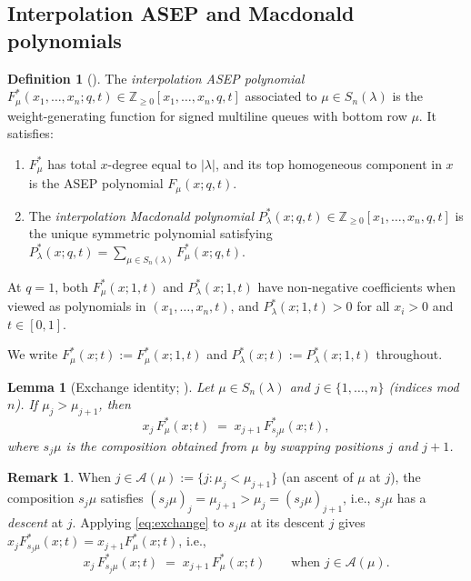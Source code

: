 \documentclass[12pt]{article}
\newtheorem{lemma}[theorem]{Lemma}
\theoremstyle{definition}
\newtheorem{definition}[theorem]{Definition}
\newtheorem{remark}[theorem]{Remark}
\begin{document}
\subsection{Interpolation ASEP and Macdonald polynomials}

\begin{definition}[{\cite[Def.~1.1,~Thm.~1.15]{BDW25}}]
\label{def:interpolation}
The \emph{interpolation ASEP polynomial}
$F^*_\mu(x_1,\dots,x_n;q,t) \in \mathbb{Z}_{\geq 0}[x_1,\dots,x_n,q,t]$
associated to $\mu \in S_n(\lambda)$ is the weight-generating function
for signed multiline queues with bottom row $\mu$.  It satisfies:
\begin{enumerate}[label=(\alph*)]
  \item $F^*_\mu$ has total $x$-degree equal to $|\lambda|$, and its top
        homogeneous component in $x$ is the ASEP polynomial $F_\mu(x;q,t)$.
  \item The \emph{interpolation Macdonald polynomial}
        $P^*_\lambda(x;q,t) \in \mathbb{Z}_{\geq 0}[x_1,\dots,x_n,q,t]$ is
        the unique symmetric polynomial satisfying $P^*_\lambda(x;q,t)
        = \sum_{\mu \in S_n(\lambda)} F^*_\mu(x;q,t)$.
\end{enumerate}
At $q = 1$, both $F^*_\mu(x;1,t)$ and $P^*_\lambda(x;1,t)$ have
non-negative coefficients when viewed as polynomials in $(x_1,\dots,x_n,t)$,
and $P^*_\lambda(x;1,t) > 0$ for all $x_i > 0$ and $t \in [0,1]$.
\end{definition}

We write $F^*_\mu(x;t) := F^*_\mu(x;1,t)$ and
$P^*_\lambda(x;t) := P^*_\lambda(x;1,t)$ throughout.

\begin{lemma}[Exchange identity; {\cite[Cor.~5.2]{BDW25}}]
\label{lem:exchange}
Let $\mu \in S_n(\lambda)$ and $j \in \{1,\dots,n\}$ (indices mod $n$).
If $\mu_j > \mu_{j+1}$, then
\begin{equation}
  x_j \, F^*_\mu(x;t) \;=\; x_{j+1} \, F^*_{s_j\mu}(x;t),
\label{eq:exchange}
\end{equation}
where $s_j\mu$ is the composition obtained from $\mu$ by swapping positions
$j$ and $j+1$.
\end{lemma}

\begin{remark}\label{rmk:exchange_use}
When $j \in \mathcal{A}(\mu) := \{j : \mu_j < \mu_{j+1}\}$ (an ascent of
$\mu$ at $j$), the composition $s_j\mu$ satisfies $(s_j\mu)_j =
\mu_{j+1} > \mu_j = (s_j\mu)_{j+1}$, i.e., $s_j\mu$ has a \emph{descent} at
$j$.  Applying \eqref{eq:exchange} to $s_j\mu$ at its descent $j$ gives
$x_j F^*_{s_j\mu}(x;t) = x_{j+1} F^*_\mu(x;t)$, i.e.,
\begin{equation}
  x_j \, F^*_{s_j\mu}(x;t) \;=\; x_{j+1} \, F^*_\mu(x;t)
  \qquad \text{when } j \in \mathcal{A}(\mu).
\label{eq:exchange_ascent}
\end{equation}
\end{remark}
\end{document}
